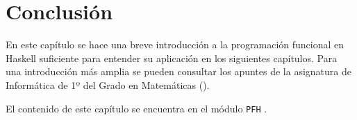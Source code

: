 \chapter{Conclusión}\label{sec:progfunHas}

En este capítulo se hace una breve introducción a la programación funcional en
Haskell suficiente para entender su aplicación en los siguientes
capítulos. Para una introducción más amplia se pueden consultar los apuntes de
la asignatura de Informática de 1º del Grado en Matemáticas
(\cite{Alonso-15b}). 

El contenido de este capítulo se encuentra en el módulo \texttt{PFH} 
.

